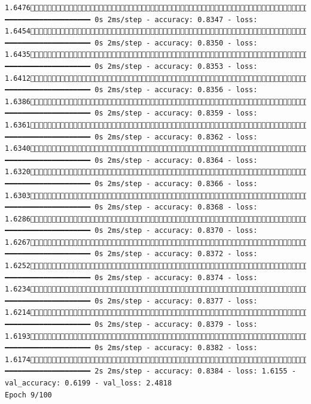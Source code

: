 \documentclass[
  letterpaper,
  DIV=11,
  numbers=noendperiod]{scrartcl}
\begin{document}
\begin{verbatim}
1.6476454/858 ━━━━━━━━━━━━━━━━━━━━ 0s 2ms/step - accuracy: 0.8347 - loss: 1.6454476/858 ━━━━━━━━━━━━━━━━━━━━ 0s 2ms/step - accuracy: 0.8350 - loss: 1.6435503/858 ━━━━━━━━━━━━━━━━━━━━ 0s 2ms/step - accuracy: 0.8353 - loss: 1.6412535/858 ━━━━━━━━━━━━━━━━━━━━ 0s 2ms/step - accuracy: 0.8356 - loss: 1.6386566/858 ━━━━━━━━━━━━━━━━━━━━ 0s 2ms/step - accuracy: 0.8359 - loss: 1.6361593/858 ━━━━━━━━━━━━━━━━━━━━ 0s 2ms/step - accuracy: 0.8362 - loss: 1.6340621/858 ━━━━━━━━━━━━━━━━━━━━ 0s 2ms/step - accuracy: 0.8364 - loss: 1.6320645/858 ━━━━━━━━━━━━━━━━━━━━ 0s 2ms/step - accuracy: 0.8366 - loss: 1.6303670/858 ━━━━━━━━━━━━━━━━━━━━ 0s 2ms/step - accuracy: 0.8368 - loss: 1.6286698/858 ━━━━━━━━━━━━━━━━━━━━ 0s 2ms/step - accuracy: 0.8370 - loss: 1.6267721/858 ━━━━━━━━━━━━━━━━━━━━ 0s 2ms/step - accuracy: 0.8372 - loss: 1.6252746/858 ━━━━━━━━━━━━━━━━━━━━ 0s 2ms/step - accuracy: 0.8374 - loss: 1.6234775/858 ━━━━━━━━━━━━━━━━━━━━ 0s 2ms/step - accuracy: 0.8377 - loss: 1.6214805/858 ━━━━━━━━━━━━━━━━━━━━ 0s 2ms/step - accuracy: 0.8379 - loss: 1.6193833/858 ━━━━━━━━━━━━━━━━━━━━ 0s 2ms/step - accuracy: 0.8382 - loss: 1.6174858/858 ━━━━━━━━━━━━━━━━━━━━ 2s 2ms/step - accuracy: 0.8384 - loss: 1.6155 - val_accuracy: 0.6199 - val_loss: 2.4818
Epoch 9/100

\end{verbatim}
\end{document}
